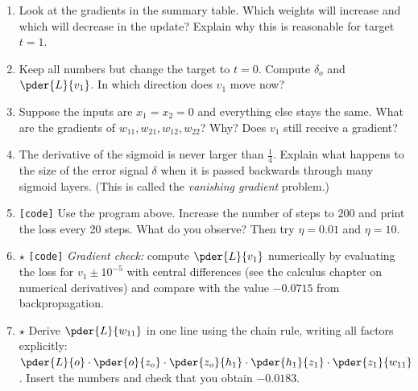 \begin{enumerate}[label=\textbf{\thechapter.\arabic*}]
  \item Look at the gradients in the summary table. Which weights will increase and which will decrease in the update? Explain why this is reasonable for target $t=1$.
  \item Keep all numbers but change the target to $t=0$. Compute $\delta_o$ and $\pder{L}{v_1}$. In which direction does $v_1$ move now?
  \item Suppose the inputs are $x_1=x_2=0$ and everything else stays the same. What are the gradients of $w_{11},w_{21},w_{12},w_{22}$? Why? Does $v_1$ still receive a gradient?
  \item The derivative of the sigmoid is never larger than $\tfrac14$. Explain what happens to the size of the error signal $\delta$ when it is passed backwards through many sigmoid layers. (This is called the \emph{vanishing gradient} problem.)
  \item \texttt{[code]} Use the program above. Increase the number of steps to $200$ and print the loss every 20 steps. What do you observe? Then try $\eta=0.01$ and $\eta=10$.
  \item $\star$ \texttt{[code]} \emph{Gradient check:} compute $\pder{L}{v_1}$ numerically by evaluating the loss for $v_1\pm10^{-5}$ with central differences (see the calculus chapter on numerical derivatives) and compare with the value $-0.0715$ from backpropagation.
  \item $\star$ Derive $\pder{L}{w_{11}}$ in one line using the chain rule, writing all factors explicitly:
  $\pder{L}{o}\cdot\pder{o}{z_o}\cdot\pder{z_o}{h_1}\cdot\pder{h_1}{z_1}\cdot\pder{z_1}{w_{11}}$. Insert the numbers and check that you obtain $-0.0183$.
\end{enumerate}
